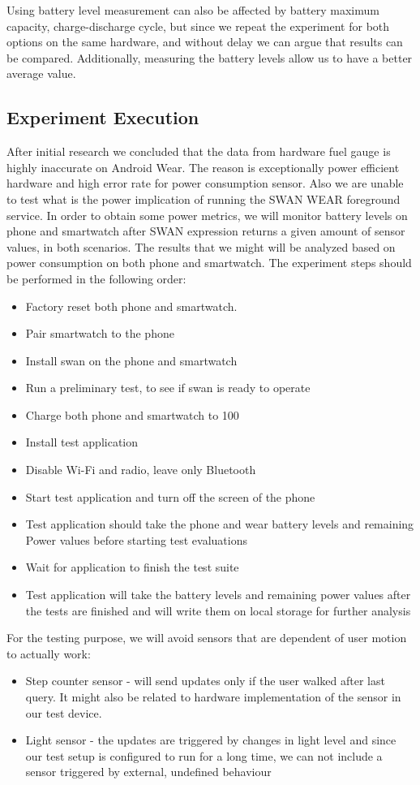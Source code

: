  Using battery level measurement can also be affected by battery maximum capacity, charge-discharge cycle, but since we repeat the experiment for both options on the same hardware, and without delay we can argue that results can be compared.
 Additionally, measuring the battery levels allow us to have a better average value.
 
 \subsection{Experiment Execution}
 After initial research we concluded that the data from hardware fuel gauge is highly inaccurate on Android Wear.
 The reason is exceptionally power efficient hardware and high error rate for power consumption sensor. 
 Also we are unable to test what is the power implication of running the SWAN WEAR foreground service. 
 In order to obtain some power metrics, we will monitor battery levels on phone and smartwatch after SWAN expression returns a given amount of sensor values, in both scenarios.
The results that we might will be analyzed based on power consumption on both phone and smartwatch.
The experiment steps should be performed in the following order:
\begin{itemize}
 \item Factory reset both phone and smartwatch.
 \item Pair smartwatch to the phone
 \item Install swan on the phone and smartwatch
 \item Run a preliminary test, to see if swan is ready to operate
 \item Charge both phone and smartwatch to 100%
 \item Install test application
 \item Disable Wi-Fi and radio, leave only Bluetooth
 \item Start test application and turn off the screen of the phone
 \item Test application should take the phone and wear battery levels and remaining Power values before starting test evaluations
 \item Wait for application to finish the test suite
 \item Test application will take the battery levels and remaining power values after the tests are finished and will write them on local storage for further analysis
\end{itemize}

For the testing purpose, we will avoid sensors that are dependent of user motion to actually work: 
\begin{itemize}
 \item Step counter sensor - will send updates only if the user walked after last query. It might also be related to hardware implementation of the sensor in our test device\cite{motorolla_stepcounter}. 
 \item Light sensor - the updates are triggered by changes in light level and since our test setup is configured to run for a long time, we can not include a sensor triggered by external,
 undefined behaviour
\end{itemize}

